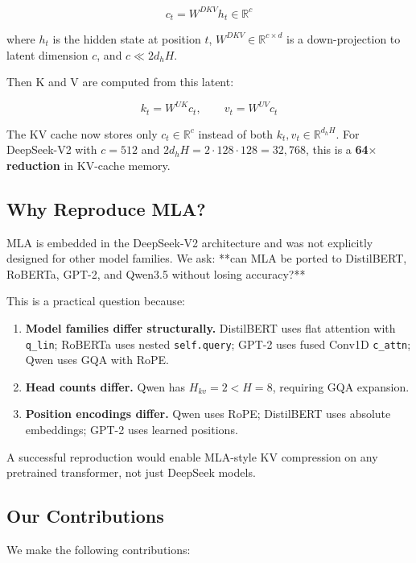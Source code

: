 \[
c_t = W^{DKV} h_t \in \mathbb{R}^{c}
\tag{1.2}
\]

where $h_t$ is the hidden state at position $t$, $W^{DKV} \in \mathbb{R}^{c \times d}$ 
is a down-projection to latent dimension $c$, and $c \ll 2 d_h H$.

Then K and V are computed from this latent:

\[
k_t = W^{UK} c_t, \qquad v_t = W^{UV} c_t
\tag{1.3}
\]

The KV cache now stores only $c_t \in \mathbb{R}^c$ instead of both 
$k_t, v_t \in \mathbb{R}^{d_h H}$. For DeepSeek-V2 with $c = 512$ and 
$2 d_h H = 2 \cdot 128 \cdot 128 = 32{,}768$, this is a \textbf{64$\times$ reduction} in 
KV-cache memory.

\subsection{Why Reproduce MLA?}

MLA is embedded in the DeepSeek-V2 architecture and was not explicitly 
designed for other model families. We ask: **can MLA be ported to 
DistilBERT, RoBERTa, GPT-2, and Qwen3.5 without losing accuracy?**

This is a practical question because:

\begin{enumerate}
\item \textbf{Model families differ structurally.} DistilBERT uses flat attention
  with \texttt{q\_lin}; RoBERTa uses nested \texttt{self.query}; GPT-2 uses fused Conv1D
  \texttt{c\_attn}; Qwen uses GQA with RoPE.
\item \textbf{Head counts differ.} Qwen has $H_{kv} = 2 < H = 8$, requiring GQA
  expansion.
\item \textbf{Position encodings differ.} Qwen uses RoPE; DistilBERT uses absolute
  embeddings; GPT-2 uses learned positions.

\end{enumerate}
A successful reproduction would enable MLA-style KV compression on any 
pretrained transformer, not just DeepSeek models.

\subsection{Our Contributions}

We make the following contributions:

